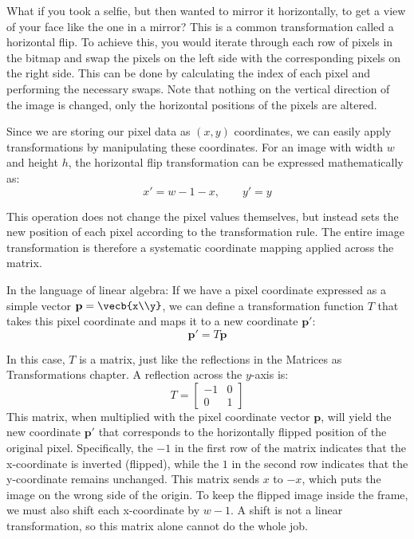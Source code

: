 What if you took a selfie, but then wanted to mirror it horizontally, to get a view of your face like the one in a mirror? This is a common transformation called a horizontal flip. To achieve this, you would iterate through each row of pixels in the bitmap and swap the pixels on the left side with the corresponding pixels on the right side. This can be done by calculating the index of each pixel and performing the necessary swaps. Note that nothing on the vertical direction of the image is changed, only the horizontal positions of the pixels are altered.

Since we are storing our pixel data as $(x,y)$ coordinates, we can easily apply transformations by manipulating these coordinates. For an image with width $w$ and height $h$, the horizontal flip transformation can be expressed mathematically as:
$$x' = w - 1 - x,\qquad y' = y$$

This operation does not change the pixel values themselves, but instead sets the new position of each pixel according to the transformation rule. The entire image transformation is therefore a systematic coordinate mapping applied across the matrix.

In the language of linear algebra: If we have a pixel coordinate expressed as a simple vector $\mathbf{p} = \vecb{x\\y}$, we can define a transformation function $T$ that takes this pixel coordinate and maps it to a new coordinate $\mathbf{p'}$:
$$\mathbf{p'} = T\mathbf{p}$$

In this case, $T$ is a matrix, just like the reflections in the Matrices as Transformations chapter. A reflection across the $y$-axis is:
$$T = \begin{bmatrix}-1 & 0 \\ 0 & 1\end{bmatrix}$$
This matrix, when multiplied with the pixel coordinate vector $\mathbf{p}$, will yield the new coordinate $\mathbf{p'}$ that corresponds to the horizontally flipped position of the original pixel. Specifically, the $-1$ in the first row of the matrix indicates that the x-coordinate is inverted (flipped), while the $1$ in the second row indicates that the y-coordinate remains unchanged. This matrix sends $x$ to $-x$, which puts the image on the wrong side of the origin. To keep the flipped image inside the frame, we must also shift each x-coordinate by $w - 1$. A shift is not a linear transformation, so this matrix alone cannot do the whole job.

